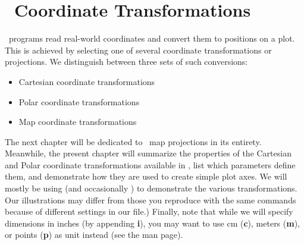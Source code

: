 %
%
\chapter{\gmt\ Coordinate Transformations}
\label{ch:5}
\thispagestyle{headings}

\GMT\ programs read real-world coordinates and convert them to positions on a plot.
This is achieved by selecting one of several coordinate transformations or projections.
We distinguish between three sets of such conversions:

\begin{itemize}
\item Cartesian coordinate transformations
\item Polar coordinate transformations
\item Map coordinate transformations
\end{itemize}

The next chapter will be dedicated to \GMT\ map projections in its entirety.  Meanwhile, the present chapter
will summarize the properties of the Cartesian and Polar coordinate transformations available in \GMT, list
which parameters define them, and demonstrate how they are used to create simple plot axes.  We will mostly
be using  (and occasionally ) to demonstrate the various transformations.
Our illustrations may differ from those you reproduce with the same commands because of different settings
in our  file.)  Finally, note that while we will specify dimensions in inches (by
appending {\bf i}), you may want to use cm ({\bf c}), meters ({\bf m}), or points ({\bf p}) as unit instead
(see the  man page). 



